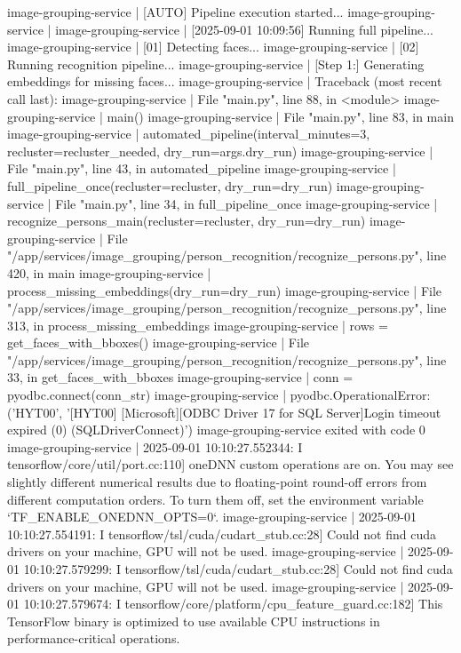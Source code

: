 image-grouping-service  | [AUTO] Pipeline execution started...
image-grouping-service  |
image-grouping-service  | [2025-09-01 10:09:56] Running full pipeline...
image-grouping-service  | [01] Detecting faces...
image-grouping-service  | [02] Running recognition pipeline...
image-grouping-service  | [Step 1:] Generating embeddings for missing faces...
image-grouping-service  | Traceback (most recent call last):
image-grouping-service  |   File "main.py", line 88, in <module>
image-grouping-service  |     main()
image-grouping-service  |   File "main.py", line 83, in main
image-grouping-service  |     automated_pipeline(interval_minutes=3, recluster=recluster_needed, dry_run=args.dry_run)
image-grouping-service  |   File "main.py", line 43, in automated_pipeline
image-grouping-service  |     full_pipeline_once(recluster=recluster, dry_run=dry_run)
image-grouping-service  |   File "main.py", line 34, in full_pipeline_once
image-grouping-service  |     recognize_persons_main(recluster=recluster, dry_run=dry_run)
image-grouping-service  |   File "/app/services/image_grouping/person_recognition/recognize_persons.py", line 420, in main
image-grouping-service  |     process_missing_embeddings(dry_run=dry_run)
image-grouping-service  |   File "/app/services/image_grouping/person_recognition/recognize_persons.py", line 313, in process_missing_embeddings
image-grouping-service  |     rows = get_faces_with_bboxes()
image-grouping-service  |   File "/app/services/image_grouping/person_recognition/recognize_persons.py", line 33, in get_faces_with_bboxes
image-grouping-service  |     conn = pyodbc.connect(conn_str)
image-grouping-service  | pyodbc.OperationalError: ('HYT00', '[HYT00] [Microsoft][ODBC Driver 17 for SQL Server]Login timeout expired (0) (SQLDriverConnect)')
image-grouping-service exited with code 0
image-grouping-service  | 2025-09-01 10:10:27.552344: I tensorflow/core/util/port.cc:110] oneDNN custom operations are on. You may see slightly different numerical results due to floating-point round-off errors from different computation orders. To turn them off, set the environment variable `TF_ENABLE_ONEDNN_OPTS=0`.
image-grouping-service  | 2025-09-01 10:10:27.554191: I tensorflow/tsl/cuda/cudart_stub.cc:28] Could not find cuda drivers on your machine, GPU will not be used.
image-grouping-service  | 2025-09-01 10:10:27.579299: I tensorflow/tsl/cuda/cudart_stub.cc:28] Could not find cuda drivers on your machine, GPU will not be used.
image-grouping-service  | 2025-09-01 10:10:27.579674: I tensorflow/core/platform/cpu_feature_guard.cc:182] This TensorFlow binary is optimized to use available CPU instructions in performance-critical operations.
